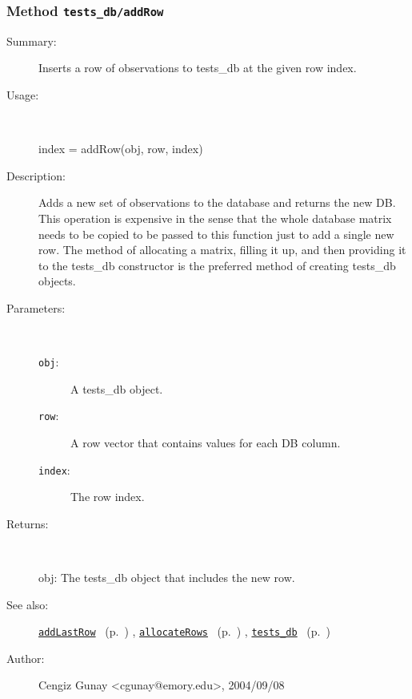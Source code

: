 \subsubsection[Method \texttt{addRow}]{Method \texttt{tests\_db/addRow}}%
%
\label{ref_tests_db__addRow}%
\hypertarget{ref_tests_db__addRow}{}%
\begin{description}
\item[Summary:]Inserts a row of observations to tests\_db at the given row index.
%
\item[Usage:]~%
\begin{lyxcode}%
index = addRow(obj, row, index)
%
\end{lyxcode}%
%
\item[Description:]%
Adds a new set of observations to the database and returns the new DB.
   This operation is expensive in the sense that the whole database matrix
   needs to be copied to be passed to this function just to add a 
   single new row. The method of allocating a matrix, filling it up, and
   then providing it to the tests\_db constructor is the preferred method 
   of creating tests\_db objects.
\item[Parameters:]~
\begin{description}%
\item[\texttt{obj}:]
 A tests\_db object.
\item[\texttt{row}:]
 A row vector that contains values for each DB column.
\item[\texttt{index}:]
 The row index.
\end{description}%
%
\item[Returns:
]~

	obj: The tests\_db object that includes the new row.
%
%
\item[See also:]%
\hyperlink{ref_addLastRow}{\texttt{addLastRow}}%
\ (p.~\pageref{ref_addLastRow})%
%
, \hyperlink{ref_allocateRows}{\texttt{allocateRows}}%
\ (p.~\pageref{ref_allocateRows})%
%
, \hyperlink{ref_tests_db}{\texttt{tests\_db}}%
\ (p.~\pageref{ref_tests_db})%
%
%
\item[Author:]%
Cengiz Gunay <cgunay@emory.edu>, 2004/09/08
%
\end{description}
\methodline%
